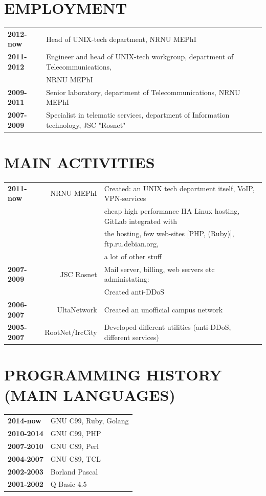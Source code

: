\begin{resume}
\section{EMPLOYMENT}
\vspace{0.1in} 
\begin{tabular}{ll}
    {\bf 2012-now } & Head of UNIX-tech department, NRNU MEPhI\\
    {\bf 2011-2012} & Engineer and head of UNIX-tech workgroup, department of Telecommunications,\\
                    & NRNU MEPhI\\
    {\bf 2009-2011} & Senior laboratory, department of Telecommunications, NRNU MEPhI\\
    {\bf 2007-2009} & Specialist in telematic services, department of Information technology, JSC "Rosnet"\\
\end{tabular}

\section{MAIN ACTIVITIES}
\vspace{0.1in} 
\begin{tabular}{lrl}
    {\bf 2011-now } & NRNU MEPhI      & Created: an UNIX tech department itself, VoIP, VPN-services\\
                    &                 & cheap high performance HA Linux hosting, GitLab integrated with\\
                    &                 & the hosting, few web-sites [PHP, (Ruby)], ftp.ru.debian.org,\\
                    &                 & a lot of other stuff\\
    {\bf 2007-2009} & JSC Rosnet      & Mail server, billing, web servers etc administating:\\
                    &                 & Created anti-DDoS\\
    {\bf 2006-2007} & UltaNetwork     & Created an unofficial campus network\\
    {\bf 2005-2007} & RootNet/IrcCity & Developed different utilities (anti-DDoS, different services)\\
\end{tabular}

\section{PROGRAMMING HISTORY (MAIN LANGUAGES)}
\vspace{0.1in} 
\begin{tabular}{ll}
{\bf 2014-now}  & GNU C99, Ruby, Golang\\
{\bf 2010-2014} & GNU C99, PHP\\
{\bf 2007-2010} & GNU C89, Perl\\
{\bf 2004-2007} & GNU C89, TCL\\
{\bf 2002-2003} & Borland Pascal\\
{\bf 2001-2002} & Q Basic 4.5\\
\end{tabular}


\end{resume}
